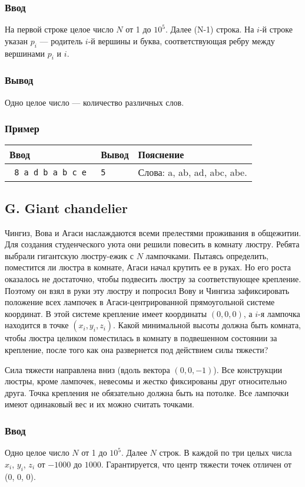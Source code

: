 \documentclass[10pt, a4paper]{article}
\newcommand{\informat}[1]
{
	\subsubsection*{Ввод} #1
}
\newcommand{\outformat}[1]
{
	\subsubsection*{Вывод} #1
}
\newcommand{\examplepic}[3]
{
	\subsubsection*{Пример}
	\noindent
	\begin{center}
	\begin{tabularx}{\linewidth}{|l|l|X|}
	\hline
	Ввод 	& Вывод  	& Пояснение\\
	\hline
	{\tt #1} 		& {\tt #2} 		& #3\\
	\hline
	\end{tabularx}
	\end{center}
}
\begin{document}
\informat{На первой строке целое число $N$ от 1 до $10^5$. Далее (N-1) строка. На $i$-й строке указан $p_i$ --- родитель $i$-й вершины и буква, соответствующая ребру между вершинами $p_i$ и $i$.}


\outformat{Одно целое число --- количество различных слов.}

\examplepic{
8 \newline
1 a \newline
5 d \newline
5 b \newline
1 a \newline
2 b \newline
6 c \newline
4 e
}{5}{Слова: a, ab, ad, abc, abe. \newline 
}





\subsection*{G. Giant chandelier}
 

Чингиз, Вова и Агаси наслаждаются всеми прелестями проживания в общежитии. Для создания студенческого уюта они решили повесить в комнату люстру. Ребята выбрали гигантскую люстру-ежик с $N$ лампочками. Пытаясь определить, поместится ли люстра в комнате, Агаси начал крутить ее в руках. Но его роста оказалось не достаточно, чтобы подвесить люстру за соответствующее крепление. Поэтому он взял в руки эту люстру и попросил Вову и Чингиза зафиксировать положение всех лампочек в Агаси-центрированной прямоугольной системе координат. В этой системе крепление имеет координаты $(0, 0, 0)$, а $i$-я лампочка находится в точке $(x_i, y_i, z_i)$. Какой минимальной высоты должна быть комната, чтобы люстра целиком поместилась в комнату в подвешенном состоянии за крепление, после того как она развернется под действием силы тяжести?

Сила тяжести направлена вниз (вдоль вектора $(0, 0, -1)$). Все конструкции люстры, кроме лампочек, невесомы и жестко фиксированы друг относительно друга. Точка крепления не обязательно должна быть на потолке. Все лампочки имеют одинаковый вес и их можно считать точками. 

\informat{Одно целое число $N$ от 1 до $10^5$. Далее $N$ строк. В каждой по три целых числа $x_i$, $y_i$, $z_i$ от $-1000$ до $1000$. Гарантируется, что центр тяжести точек отличен от (0, 0, 0).}
\end{document}
